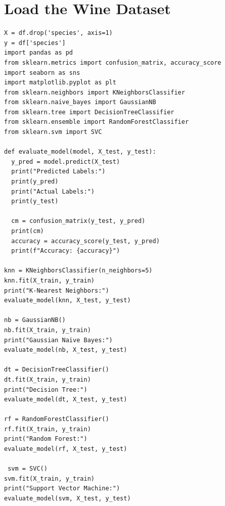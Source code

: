 \section{Load the Wine Dataset}
\vspace{-.9cm}
\begin{code}
\begin{lstlisting}
X = df.drop('species', axis=1)
y = df['species']
import pandas as pd
from sklearn.metrics import confusion_matrix, accuracy_score
import seaborn as sns
import matplotlib.pyplot as plt
from sklearn.neighbors import KNeighborsClassifier
from sklearn.naive_bayes import GaussianNB
from sklearn.tree import DecisionTreeClassifier
from sklearn.ensemble import RandomForestClassifier
from sklearn.svm import SVC

def evaluate_model(model, X_test, y_test):
  y_pred = model.predict(X_test)
  print("Predicted Labels:")
  print(y_pred)
  print("Actual Labels:")
  print(y_test)

  cm = confusion_matrix(y_test, y_pred)
  print(cm)
  accuracy = accuracy_score(y_test, y_pred)
  print(f"Accuracy: {accuracy}")

knn = KNeighborsClassifier(n_neighbors=5)
knn.fit(X_train, y_train)
print("K-Nearest Neighbors:")
evaluate_model(knn, X_test, y_test)

nb = GaussianNB()
nb.fit(X_train, y_train)
print("Gaussian Naive Bayes:")
evaluate_model(nb, X_test, y_test)

dt = DecisionTreeClassifier()
dt.fit(X_train, y_train)
print("Decision Tree:")
evaluate_model(dt, X_test, y_test)

rf = RandomForestClassifier()
rf.fit(X_train, y_train)
print("Random Forest:")
evaluate_model(rf, X_test, y_test)

 svm = SVC()
svm.fit(X_train, y_train)
print("Support Vector Machine:")
evaluate_model(svm, X_test, y_test)   
\end{lstlisting}
\end{code}
\newpage
\vspace{-1cm}
